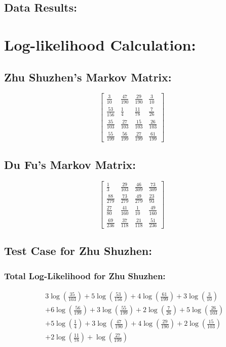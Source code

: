 \documentclass[12pt]{article}
\begin{document}
\newpage

\subsection{Data Results: }

\section*{Log-likelihood Calculation: }

\subsection*{Zhu Shuzhen's Markov Matrix:}

\[
\begin{bmatrix}
\frac{3}{10} & \frac{47}{190} & \frac{29}{190} & \frac{3}{10} \\
\frac{53}{156} & \frac{1}{4} & \frac{11}{78} & \frac{7}{26} \\
\frac{35}{103} & \frac{27}{103} & \frac{15}{103} & \frac{26}{103} \\
\frac{55}{199} & \frac{56}{199} & \frac{27}{199} & \frac{61}{199}
\end{bmatrix}
\]

\subsection*{Du Fu's Markov Matrix:}

\[
\begin{bmatrix}
\frac{1}{3} & \frac{29}{103} & \frac{46}{309} & \frac{73}{309} \\
\frac{88}{279} & \frac{73}{279} & \frac{49}{279} & \frac{23}{93} \\
\frac{27}{80} & \frac{41}{160} & \frac{1}{10} & \frac{49}{160} \\
\frac{69}{236} & \frac{37}{118} & \frac{21}{118} & \frac{51}{236}
\end{bmatrix}
\]

\subsection*{Test Case for Zhu Shuzhen: }

\subsubsection*{Total Log-Likelihood for Zhu Shuzhen:}

\begin{align*}
& 3 \log\left(\frac{35}{103}\right) + 5 \log\left(\frac{53}{156}\right) + 4 \log\left(\frac{61}{199}\right) + 3 \log\left(\frac{3}{10}\right) \\
& + 6 \log\left(\frac{56}{199}\right) + 3 \log\left(\frac{55}{199}\right) + 2 \log\left(\frac{7}{26}\right) + 5 \log\left(\frac{26}{103}\right) \\
& + 5 \log\left(\frac{1}{4}\right) + 3 \log\left(\frac{47}{190}\right) + 4 \log\left(\frac{29}{190}\right) + 2 \log\left(\frac{15}{103}\right) \\
& + 2 \log\left(\frac{11}{78}\right) + \log\left(\frac{27}{199}\right)
\end{align*}
\end{document}
